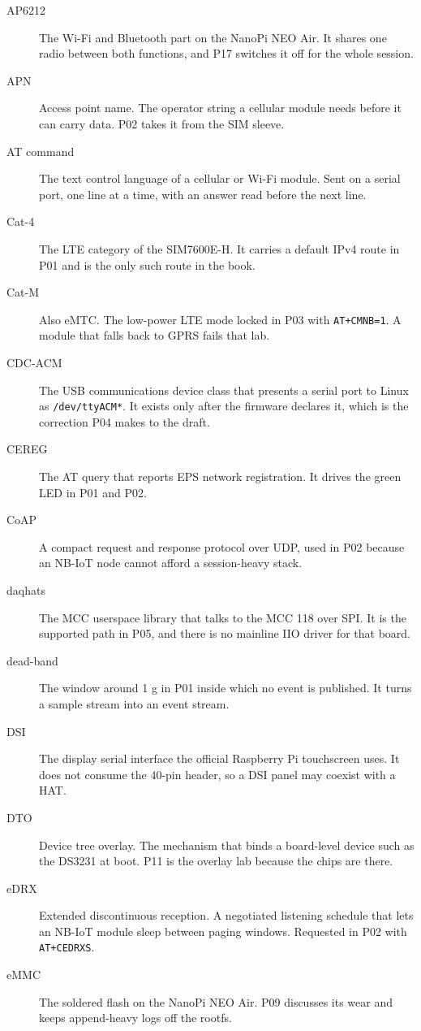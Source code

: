 \begin{description}
\item[AP6212] The Wi-Fi and Bluetooth part on the NanoPi NEO Air. It shares one radio between both functions, and P17 switches it off for the whole session.
\item[APN] Access point name. The operator string a cellular module needs before it can carry data. P02 takes it from the SIM sleeve.
\item[AT command] The text control language of a cellular or Wi-Fi module. Sent on a serial port, one line at a time, with an answer read before the next line.
\item[Cat-4] The LTE category of the SIM7600E-H. It carries a default IPv4 route in P01 and is the only such route in the book.
\item[Cat-M] Also eMTC. The low-power LTE mode locked in P03 with \texttt{AT+CMNB=1}. A module that falls back to GPRS fails that lab.
\item[CDC-ACM] The USB communications device class that presents a serial port to Linux as \texttt{/dev/ttyACM*}. It exists only after the firmware declares it, which is the correction P04 makes to the draft.
\item[CEREG] The AT query that reports EPS network registration. It drives the green LED in P01 and P02.
\item[CoAP] A compact request and response protocol over UDP, used in P02 because an NB-IoT node cannot afford a session-heavy stack.
\item[daqhats] The MCC userspace library that talks to the MCC 118 over SPI. It is the supported path in P05, and there is no mainline IIO driver for that board.
\item[dead-band] The window around 1 g in P01 inside which no event is published. It turns a sample stream into an event stream.
\item[DSI] The display serial interface the official Raspberry Pi touchscreen uses. It does not consume the 40-pin header, so a DSI panel may coexist with a HAT.
\item[DTO] Device tree overlay. The mechanism that binds a board-level device such as the DS3231 at boot. P11 is the overlay lab because the chips are there.
\item[eDRX] Extended discontinuous reception. A negotiated listening schedule that lets an NB-IoT module sleep between paging windows. Requested in P02 with \texttt{AT+CEDRXS}.
\item[eMMC] The soldered flash on the NanoPi NEO Air. P09 discusses its wear and keeps append-heavy logs off the rootfs.

\end{description}
